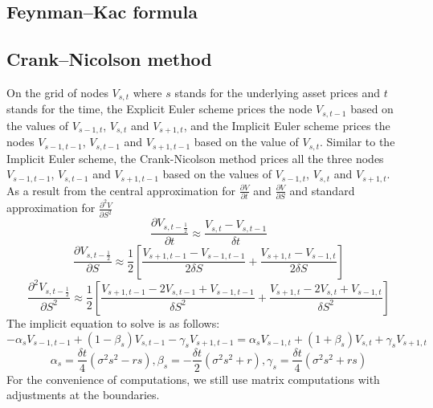 \subsection{Feynman–Kac formula}
\newpage
\subsection{Crank–Nicolson method}
On the grid of nodes $V_{s,t}$ where $s$ stands for the underlying asset prices and $t$ stands for the time, the Explicit Euler scheme prices the node $V_{s,t-1}$ based on the values of $V_{s-1,t}$, $V_{s,t}$ and $V_{s+1,t}$, and the Implicit Euler scheme prices the nodes $V_{s-1,t-1}$, $V_{s,t-1}$ and $V_{s+1,t-1}$ based on the value of $V_{s,t}$. Similar to the Implicit Euler scheme, the Crank-Nicolson method prices all the three nodes $V_{s-1,t-1}$, $V_{s,t-1}$ and $V_{s+1,t-1}$ based on the values of $V_{s-1,t}$, $V_{s,t}$ and $V_{s+1,t}$.\\
As a result from the central approximation for $\displaystyle \frac{\partial V}{\partial t}$ and $\displaystyle \frac{\partial V}{\partial S}$ and standard approximation for $\displaystyle \frac{\partial^{2} V}{\partial S^{2}}$
$$\frac{\partial V_{s, t-\frac{1}{2}}}{\partial t} \approx \frac{V_{s,t}-V_{s,t-1}}{\delta t}$$
$$\frac{\partial V_{s, t-\frac{1}{2}}}{\partial S} \approx \frac{1}{2}[\frac{V_{s+1,t-1}-V_{s-1,t-1}}{2\delta S} + \frac{V_{s+1,t}-V_{s-1,t}}{2\delta S}]$$
$$\frac{\partial^{2} V_{s, t-\frac{1}{2}}}{\partial S^{2}} \approx \frac{1}{2}[\frac{V_{s+1,t-1}-2V_{s,t-1}+V_{s-1,t-1}}{\delta S^{2}} + \frac{V_{s+1,t}-2V_{s,t}+V_{s-1,t}}{\delta S^{2}}]$$
The implicit equation to solve is as follows:
$$-\alpha_{s}V_{s-1,t-1} + (1-\beta_{s})V_{s,t-1} - \gamma_{s}V_{s+1,t-1} = \alpha_{s}V_{s-1,t} + (1+\beta_{s})V_{s,t} + \gamma_{s}V_{s+1,t}$$
$$\alpha_{s} = \frac{\delta t}{4}(\sigma^{2}s^{2} - rs), \beta_{s} = -\frac{\delta t}{2}(\sigma^{2}s^{2} + r), \gamma_{s} = \frac{\delta t}{4}(\sigma^{2}s^{2} + rs)$$
For the convenience of computations, we still use matrix computations with adjustments at the boundaries.\\
